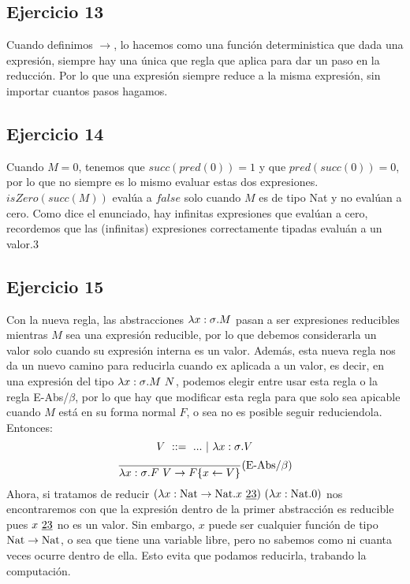 \documentclass[10pt,a4paper, landscape]{article}
\begin{document}
\vspace*{5mm}
\begin{multicols}{2}
\subsection{Ejercicio 13}
Cuando definimos $\to$, lo hacemos como una función deterministica que dada una expresión, siempre hay una única que regla que aplica para dar un paso en la reducción. Por lo que una expresión siempre reduce a la misma expresión, sin importar cuantos pasos hagamos.

\subsection{Ejercicio 14}
Cuando $M = 0$, tenemos que $succ(pred(0)) = 1$ y que $pred(succ(0)) = 0$, por lo que no siempre es lo mismo evaluar estas dos expresiones. $isZero(succ(M))$ evalúa a $false$ solo cuando $M$ es de tipo Nat y no evalúan a cero. Como dice el enunciado, hay infinitas expresiones que evalúan a cero, recordemos que las (infinitas) expresiones correctamente tipadas evaluán a un valor.3

\subsection{Ejercicio 15}
Con la nueva regla, las abstracciones $\lambda x: \sigma \text{.} M$ pasan a ser expresiones reducibles mientras $M$ sea una expresión reducible, por lo que debemos considerarla un valor solo cuando su expresión interna es un valor. Además, esta nueva regla nos da un nuevo camino para reducirla cuando ex aplicada a un valor, es decir, en una expresión del tipo $\lambda x: \sigma \text{.} M~N$, podemos elegir entre usar esta regla o la regla E-Abs/$\beta$, por lo que hay que modificar esta regla para que solo sea apicable cuando $M$ está en su forma normal $F$, o sea no es posible seguir reduciendola. Entonces:
$$V~::=~ ...~|~\lambda x: \sigma \text{.} V$$
$$\frac{}{\lambda x: \sigma \text{.} F~V\to F\{x\leftarrow V\}}(\text{E-Abs/}\beta)$$
Ahora, si tratamos de reducir $(\lambda x: \text{Nat}\to\text{Nat} \text{.} x~\underline{23})~(\lambda x: \text{Nat} \text{.} 0)$ nos encontraremos con que la expresión dentro de la primer abstracción es reducible pues $x~\underline{23}$ no es un valor. Sin embargo,  $x$ puede ser cualquier función de tipo  $\text{Nat}\to\text{Nat}$, o sea que tiene una variable libre, pero no sabemos como ni cuanta veces ocurre dentro de ella. Esto evita que podamos reducirla, trabando la computación.
\end{multicols}
\end{document}

